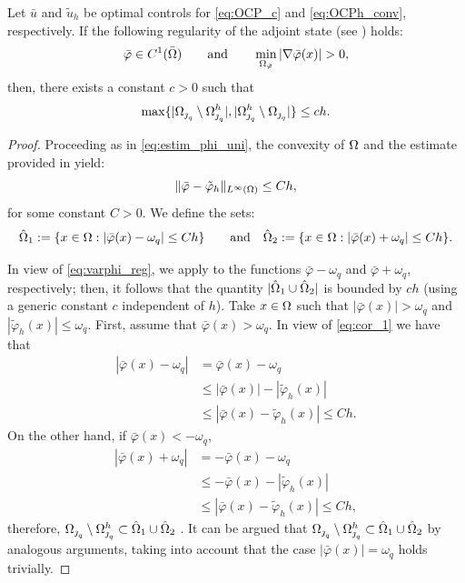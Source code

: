 {\begin{lemma}\label{lemma2}
Let $\bar u$  and $\tilde u_h$ be optimal controls for \eqref{eq:OCP_c} and  \eqref{eq:OCPh_conv}, respectively. If the following regularity of the adjoint state (see \cite{deckelnick10}) holds:
\begin{equation}\label{eq:varphi_reg}
\bar\varphi \in C^1(\bar\om)\qquad \text{and}\qquad \min_{\om_{\bar\varphi}}|\nabla \bar\varphi(x)|>0,
\end{equation}
then, there exists a constant $c>0$ such that
\begin{equation}\label{eq:lemma_2_1}
    \max\{|{\Omega_{\operatorname{\jmath}_q}}\setminus  {\Omega^h_{\operatorname{\jmath}_q}} | , |{\Omega^h_{\operatorname{\jmath}_q}}\setminus  {\Omega_{\operatorname{\jmath}_q}}  | \}\le ch. 
\end{equation}
\end{lemma}

\begin{proof}
Proceeding as in \eqref{eq:estim_phi_uni}, the convexity of $\Omega$ and the estimate provided in \cite[Theorem 19.3]{ciarlet1990} yield: 
\begin{equation}\label{eq:cor_1}
    \lVert \bar\varphi-\tilde\varphi_h \rVert_{L^{\infty}(\Omega)}\le C h,
\end{equation} 
for some constant $C>0$. We define the sets:
\[
\hat{\Omega}_1:=\{x\in \Omega: |\bar\varphi(x)-\omega_q|\le Ch\} \qquad \text{and}\quad \hat{\Omega}_2:=\{x\in \Omega: |\bar\varphi(x)+\omega_q|\le Ch\}.
\]

In view of \eqref{eq:varphi_reg},  we apply \cite[Lemma 3.2]{deckelnick10}   to the functions $\bar\varphi-\omega_q$ and $\bar\varphi+\omega_q$, respectively; then, it follows that the quantity $|\hat{\Omega}_1\cup \hat{\Omega}_2|$ is bounded by $ch$ (using a generic constant $c$ independent of $h$). %
Take $x\in \Omega$ such that $|\bar\varphi(x)|>\omega_q$ and $|\tilde\varphi_h(x)|\le \omega_q$. First, assume that $\bar\varphi(x)>\omega_q$. In view of \eqref{eq:cor_1} we have that
\begin{align*}
    |\bar\varphi(x)-\omega_q|&=\bar\varphi(x)-\omega_q\\
    &\le |\bar\varphi(x)|-|\tilde\varphi_h(x)|\\
    &\le |\bar\varphi(x)-\tilde\varphi_h(x)|\le Ch.
\end{align*}
On the other hand, if $\bar\varphi(x)<-\omega_q$, 
\begin{align*}
    |\bar\varphi(x)+\omega_q|&=-\bar\varphi(x)-\omega_q\\
    &\le-\bar\varphi(x)-|\tilde\varphi_h(x)|\\
    &\le |\bar\varphi(x)-\tilde\varphi_h(x)|\le Ch,
\end{align*}
therefore, $\Omega_{\operatorname{\jmath}_q}\setminus \Omega_{\operatorname{\jmath}_q}^h\subset \hat{\Omega}_1\cup \hat{\Omega}_2$ . It can be argued that $\Omega_{\operatorname{\jmath}_q}\setminus\Omega_{\operatorname{\jmath}_q}^h\subset \hat{\Omega}_1\cup\hat{\Omega}_2$ by analogous arguments, taking into account that the case $|\bar\varphi(x)|=\omega_q$ holds trivially.
\end{proof}

}
